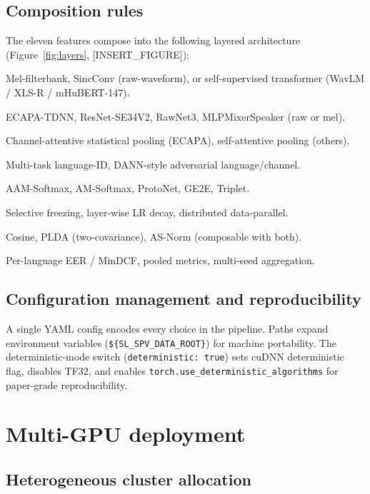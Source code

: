 \documentclass[11pt,a4paper]{article}
\begin{document}
\subsection{Composition rules}

The eleven features compose into the following layered architecture
(Figure~\ref{fig:layers}, [INSERT\_FIGURE]):

\begin{description}[leftmargin=*,style=nextline]
    \item[Front-end] Mel-filterbank, SincConv (raw-waveform), or
    self-supervised transformer (WavLM / XLS-R / mHuBERT-147).
    \item[Backbone] ECAPA-TDNN, ResNet-SE34V2, RawNet3, MLPMixerSpeaker
    (raw or mel).
    \item[Pooling] Channel-attentive statistical pooling (ECAPA),
    self-attentive pooling (others).
    \item[Training-time auxiliary heads] Multi-task language-ID,
    DANN-style adversarial language/channel.
    \item[Loss] AAM-Softmax, AM-Softmax, ProtoNet, GE2E, Triplet.
    \item[Optimisation] Selective freezing, layer-wise LR decay,
    distributed data-parallel.
    \item[Eval backends] Cosine, PLDA (two-covariance), AS-Norm
    (composable with both).
    \item[Reporting] Per-language EER / MinDCF, pooled metrics,
    multi-seed aggregation.
\end{description}

\subsection{Configuration management and reproducibility}

A single YAML config encodes every choice in the pipeline. Paths
expand environment variables (\texttt{\$\{SL\_SPV\_DATA\_ROOT\}}) for
machine portability. The deterministic-mode switch
(\texttt{deterministic: true}) sets cuDNN deterministic flag,
disables TF32, and enables \texttt{torch.use\_deterministic\_algorithms}
for paper-grade reproducibility.

\section{Multi-GPU deployment}
\label{sec:deployment}

\subsection{Heterogeneous cluster allocation}
\label{sec:deploy:hetero}
\end{document}
